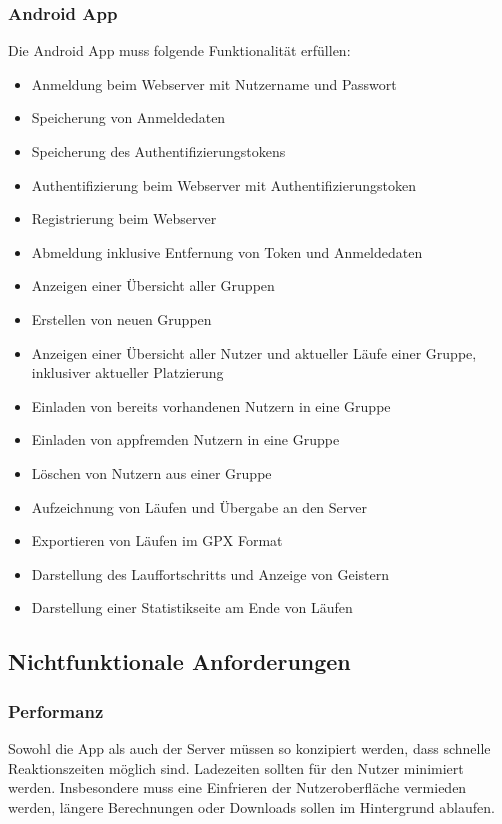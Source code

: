 \subsubsection{Android App}
Die Android App muss folgende Funktionalität erfüllen:
\begin{itemize}
\item Anmeldung beim Webserver mit Nutzername und Passwort
\item Speicherung von Anmeldedaten
\item Speicherung des Authentifizierungstokens
\item Authentifizierung beim Webserver mit Authentifizierungstoken
\item Registrierung beim Webserver
\item Abmeldung inklusive Entfernung von Token und Anmeldedaten
\item Anzeigen einer Übersicht aller Gruppen
\item Erstellen von neuen Gruppen
\item Anzeigen einer Übersicht aller Nutzer und aktueller Läufe einer Gruppe, inklusiver aktueller Platzierung
\item Einladen von bereits vorhandenen Nutzern in eine Gruppe
\item Einladen von appfremden Nutzern in eine Gruppe
\item Löschen von Nutzern aus einer Gruppe
\item Aufzeichnung von Läufen und Übergabe an den Server
\item Exportieren von Läufen im GPX Format
\item Darstellung des Lauffortschritts und Anzeige von Geistern
\item Darstellung einer Statistikseite am Ende von Läufen
\end{itemize}
\subsection{Nichtfunktionale Anforderungen}
\subsubsection{Performanz}
Sowohl die App als auch der Server müssen so konzipiert werden, dass schnelle Reaktionszeiten möglich sind. Ladezeiten sollten für den Nutzer minimiert werden. Insbesondere muss eine Einfrieren der Nutzeroberfläche vermieden werden, längere Berechnungen oder Downloads sollen im Hintergrund ablaufen.

